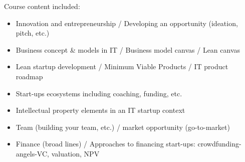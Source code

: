 Course content included:
\begin{itemize}
    \item Innovation and entrepreneurship / Developing an opportunity (ideation, pitch, etc.)
    \item Business concept \& models in IT / Business model canvas / Lean canvas
    \item Lean startup development / Minimum Viable Products / IT product roadmap
    \item Start-ups ecosystems including coaching, funding, etc.
    \item Intellectual property elements in an IT startup context
    \item Team (building your team, etc.) / market opportunity (go-to-market)
    \item Finance (broad lines) / Approaches to financing start-ups: crowdfunding- angels-VC, valuation, NPV
\end{itemize}